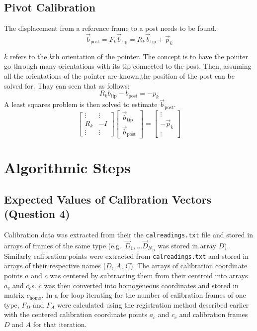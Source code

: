 \documentclass[12pt,letterpaper]{scrartcl}
\begin{document}
        \subsection{Pivot Calibration}
        The displacement from a reference frame to a post needs to be found.
        \[\vec{b}_\text{post} = F_k \vec{b}_\text{tip} = R_k \vec{b}_\text{tip} + \vec{p}_k\]
        
        $k$ refers to the $k$th orientation of the pointer.
        The concept is to have the pointer go through many orientations with its tip connected to the post. 
        Then, assuming all the orientations of the pointer are known,the position of the post can be solved for. Thay can seen that as follows:
        \[R_k b_\text{tip} - b_\text{post} = -p_k\]
        A least squares problem is then solved to estimate $\vec{b}_\text{post}$.
        \[ \begin{bmatrix}
        \vdots & \vdots\\
        R_k & -I\\
        \vdots & \vdots
        \end{bmatrix} \begin{bmatrix}
        \vec{b}_\text{tip}\\
        \vec{b}_\text{post}
        \end{bmatrix} = \begin{bmatrix}
        \vdots\\
        -\vec{p}_k\\
        \vdots
        \end{bmatrix}\]
    
    \section{Algorithmic Steps}
    \subsection{Expected Values of Calibration Vectors (Question 4)}
    Calibration data was extracted from their the \texttt{calreadings.txt} file and stored in arrays of frames of the same type (e.g.\ $\vec{D}_1, \ldots \vec{D}_{N_D}$ was stored in array $D$).
    Similarly calibration points were extracted from \texttt{calreadings.txt} and stored in arrays of their respective names ($D$, $A$, $C$).
    The arrays of calibration coordinate points $a$ and $c$ was centered by subtracting them from their centroid into arrays $a_c$ and $c_c$s.
    $c$ was then converted into homogeneous coordinates and stored in matrix $c_\text{homo}$.
    In a for loop iterating for the number of calibration frames of one type, $F_D$ and $F_A$ were calculated using the registration method described earlier with the centered calibration coordinate points $a_c$ and $c_c$ and calibration frames $D$ and $A$ for that iteration.
    
\end{document}

